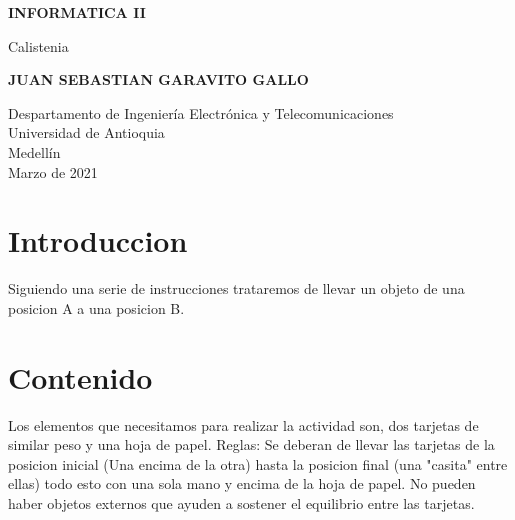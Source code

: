 \documentclass{article}
\begin{document}
\begin{titlepage}
    \begin{center}
        \vspace*{1cm}
            
        \Huge
        \textbf{INFORMATICA II}
            
        \vspace{0.5cm}
        \LARGE
        Calistenia 
            
        \vspace{1.5cm}
            
        \textbf{JUAN SEBASTIAN GARAVITO GALLO}
            
        \vfill
            
        \vspace{0.8cm}
            
        \Large
        Despartamento de Ingeniería Electrónica y Telecomunicaciones\\
        Universidad de Antioquia\\
        Medellín\\
        Marzo de 2021
            
    \end{center}
\end{titlepage}

\newpage
\section{Introduccion}\label{intro}
Siguiendo una serie de instrucciones trataremos de llevar un objeto de una posicion A a una posicion B.

\section{Contenido} \label{contenido}
Los elementos que necesitamos para realizar la actividad son, dos tarjetas de similar peso y una hoja de papel.
Reglas: Se deberan de llevar las tarjetas de la posicion inicial (Una encima de la otra) hasta la posicion final (una "casita" entre ellas) todo esto con una sola mano y encima de la hoja de papel. No pueden haber objetos externos que ayuden a sostener el equilibrio entre las tarjetas.
\end{document}
